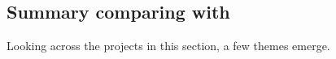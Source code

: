 





\subsection{Summary comparing with \Make}

Looking across the projects in this section, a few themes emerge.


